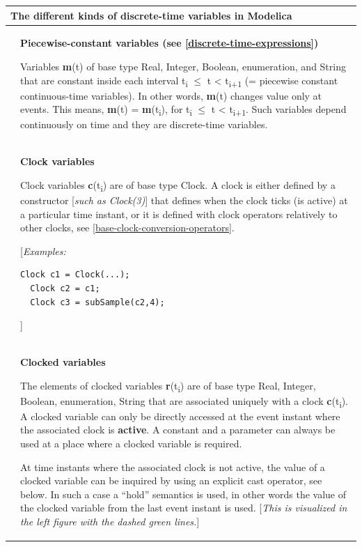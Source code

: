 \documentclass[10pt,a4paper]{report}
\begin{document}
\begin{longtable}[]{|p{7cm}|p{7cm}|}
\hline
\multicolumn{2}{|p{14cm}|}{\textbf{The different kinds of discrete-time variables in Modelica}}\\ \hline
\endhead
&
\textbf{Piecewise-constant variables (see \ref{discrete-time-expressions})}

Variables \textbf{m}(t) of base type Real, Integer, Boolean,
enumeration, and String that are {constant} inside each interval
t\textsubscript{i} $\le$ t \textless{} t\textsubscript{i+1} (= piecewise
constant continuous-time variables). In other words, \textbf{m}(t)
{changes} value {only at events}. This means, \textbf{m}(t) =
\textbf{m}(t\textsubscript{i}), for t\textsubscript{i} $\le$ t \textless{}
t\textsubscript{i+1}. Such variables depend continuously on time and
they are discrete-time variables.
\\ \hline
&
\textbf{Clock variables}

Clock variables \textbf{c}(t\textsubscript{i}) are of base type Clock. A
clock is either defined by a constructor {[}\emph{such as Clock(3)}{]}
that defines when the clock ticks (is active) at a particular time
instant, or it is defined with clock operators relatively to other
clocks, see \ref{base-clock-conversion-operators}.

{[}\emph{Examples:}
\begin{lstlisting}[language=modelica]
  Clock c1 = Clock(...);
  Clock c2 = c1;
  Clock c3 = subSample(c2,4);
\end{lstlisting}
{]}
\\ \hline
&
\textbf{Clocked variables}

The elements of clocked variables \textbf{r}(t\textsubscript{i}) are of
base type Real, Integer, Boolean, enumeration, String that are
associated uniquely with a clock \textbf{c}(t\textsubscript{i}). A
clocked variable can only be directly accessed at the event instant
where the associated clock is \textbf{active}. A constant and a
parameter can always be used at a place where a clocked variable is
required.

At time instants where the associated clock is not active, the value of
a clocked variable can be inquired by using an explicit cast operator,
see below. In such a case a ``hold'' semantics is used, in other words
the value of the clocked variable from the last event instant is used.
{[}\emph{This is visualized in the left figure with the dashed green
lines.}{]}\\ \hline

\end{longtable}
\end{document}
